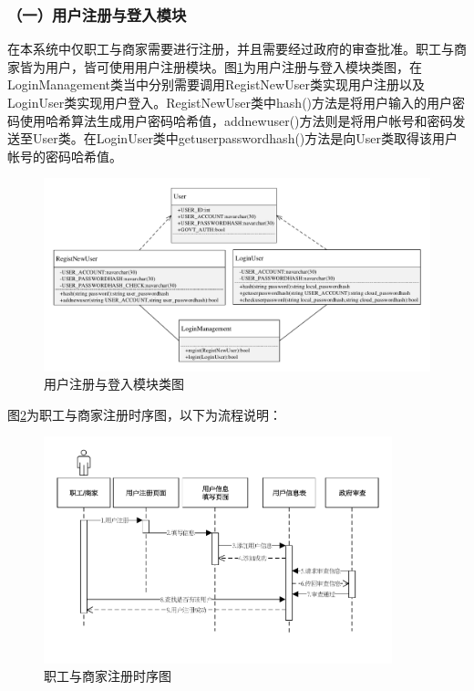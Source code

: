 \subsubsection{（一）用户注册与登入模块}
在本系统中仅职工与商家需要进行注册，并且需要经过政府的审查批准。职工与商家皆为用户，皆可使用用户注册模块。图\ref{c3}为用户注册与登入模块类图，在LoginManagement类当中分别需要调用RegistNewUser类实现用户注册以及LoginUser类实现用户登入。RegistNewUser类中hash()方法是将用户输入的用户密码使用哈希算法生成用户密码哈希值，addnewuser()方法则是将用户帐号和密码发送至User类。在LoginUser类中getuserpasswordhash()方法是向User类取得该用户帐号的密码哈希值。

	\begin{figure}[!htbp]
		\centering
		\includegraphics[width = 1\textwidth]{c3.pdf}
		\caption{用户注册与登入模块类图}\label{c3}
	\end{figure}

	图\ref{time1}为职工与商家注册时序图，以下为流程说明：

	\begin{figure}[!htbp]
		\centering
		\includegraphics[width = 0.9\textwidth]{time1.pdf}
		\caption{职工与商家注册时序图}\label{time1}
	\end{figure}

